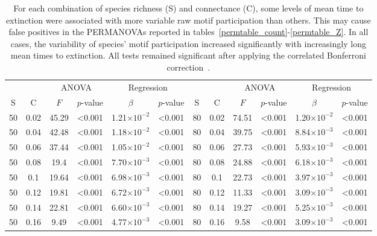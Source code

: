 \documentclass[12pt]{article}
\begin{document}
		\begin{table}[hb!]
			\caption{For each combination of species richness (S) and connectance (C), some levels of mean time to extinction were associated with more variable raw motif participation than others. This may cause false positives in the PERMANOVAs reported in tables~\ref{permtable_count}-\ref{permtable_Z}. In all cases, the variability of species' motif participation increased significantly with increasingly long mean times to extinction. All tests remained significant after applying the correlated Bonferroni correction~\citep{Drezner2016}.}
			\label{betadisp_count}
			\footnotesize
			\begin{tabular}{c c | c c| c c ||c c | c c | c c |}
				&		&	\multicolumn{2}{c|}{ANOVA}	&\multicolumn{2}{c||}{Regression} 			& & & 	\multicolumn{2}{c|}{ANOVA}		 	&	 \multicolumn{2}{c|}{Regression} 			\\
	            S	&	C	&	$F$	&	$p$-value	&	$\beta$	&	$p$-value	&	S	&	C	&	$F$	&	$p$-value	&	$\beta$	&	$p$-value	\\
				\hline
                50  & 0.02  & 45.29 & \textless0.001 & 1.21$\times10^{-2}$ & \textless0.001 & 80  & 0.02  & 74.51 & \textless0.001 & 1.20$\times10^{-2}$ & \textless0.001 \\
                50  & 0.04  & 42.48 & \textless0.001 & 1.18$\times10^{-2}$ & \textless0.001 & 80  & 0.04  & 39.75 & \textless0.001 & 8.84$\times10^{-3}$ & \textless0.001 \\
                50  & 0.06  & 37.44 & \textless0.001 & 1.05$\times10^{-2}$ & \textless0.001 & 80  & 0.06  & 27.73 & \textless0.001 & 5.93$\times10^{-3}$ & \textless0.001 \\
                50  & 0.08  & 19.4  & \textless0.001 & 7.70$\times10^{-3}$ & \textless0.001 & 80  & 0.08  & 24.88 & \textless0.001 & 6.18$\times10^{-3}$ & \textless0.001 \\
                50  & 0.1 & 19.64 & \textless0.001 & 6.98$\times10^{-3}$ & \textless0.001 & 80  & 0.1 & 22.73 & \textless0.001 & 3.97$\times10^{-3}$ & \textless0.001 \\
                50  & 0.12  & 19.81 & \textless0.001 & 6.72$\times10^{-3}$ & \textless0.001 & 80  & 0.12  & 11.33 & \textless0.001 & 3.09$\times10^{-3}$ & \textless0.001 \\
                50  & 0.14  & 22.81 & \textless0.001 & 6.60$\times10^{-3}$ & \textless0.001 & 80  & 0.14  & 19.27 & \textless0.001 & 5.25$\times10^{-3}$ & \textless0.001 \\
                50  & 0.16  & 9.49  & \textless0.001 & 4.77$\times10^{-3}$ & \textless0.001 & 80  & 0.16  & 9.58  & \textless0.001 & 3.09$\times10^{-3}$ & \textless0.001 \\

\end{tabular}
\end{table}
\end{document}
